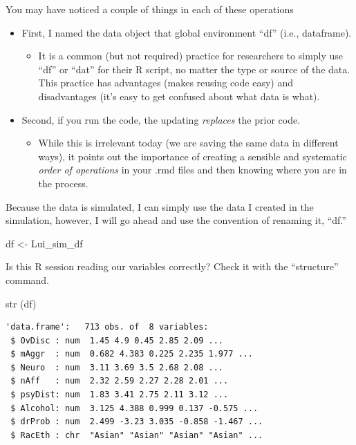 \documentclass[
  english,
]{book}
\newenvironment{Shaded}{\begin{snugshade}}{\end{snugshade}}
\newcommand{\FunctionTok}[1]{\textcolor[rgb]{0.00,0.00,0.00}{#1}}
\newcommand{\NormalTok}[1]{#1}
\newcommand{\OtherTok}[1]{\textcolor[rgb]{0.56,0.35,0.01}{#1}}
\providecommand{\tightlist}{%
  \setlength{\itemsep}{0pt}\setlength{\parskip}{0pt}}
\begin{document}
You may have noticed a couple of things in each of these operations

\begin{itemize}
\tightlist
\item
  First, I named the data object that global environment ``df'' (i.e., dataframe).

  \begin{itemize}
  \tightlist
  \item
    It is a common (but not required) practice for researchers to simply use ``df'' or ``dat'' for their R script, no matter the type or source of the data. This practice has advantages (makes reusing code easy) and disadvantages (it's easy to get confused about what data is what).
  \end{itemize}
\item
  Second, if you run the code, the updating \emph{replaces} the prior code.

  \begin{itemize}
  \tightlist
  \item
    While this is irrelevant today (we are saving the same data in different ways), it points out the importance of creating a sensible and systematic \emph{order of operations} in your .rmd files and then knowing where you are in the process.
  \end{itemize}
\end{itemize}

Because the data is simulated, I can simply use the data I created in the simulation, however, I will go ahead and use the convention of renaming it, ``df.''

\begin{Shaded}
\begin{Highlighting}[]
\NormalTok{df }\OtherTok{\textless{}{-}}\NormalTok{ Lui\_sim\_df}
\end{Highlighting}
\end{Shaded}

Is this R session reading our variables correctly? Check it with the ``structure'' command.

\begin{Shaded}
\begin{Highlighting}[]
\FunctionTok{str}\NormalTok{ (df)}
\end{Highlighting}
\end{Shaded}

\begin{verbatim}
'data.frame':   713 obs. of  8 variables:
 $ OvDisc : num  1.45 4.9 0.45 2.85 2.09 ...
 $ mAggr  : num  0.682 4.383 0.225 2.235 1.977 ...
 $ Neuro  : num  3.11 3.69 3.5 2.68 2.08 ...
 $ nAff   : num  2.32 2.59 2.27 2.28 2.01 ...
 $ psyDist: num  1.83 3.41 2.75 2.11 3.12 ...
 $ Alcohol: num  3.125 4.388 0.999 0.137 -0.575 ...
 $ drProb : num  2.499 -3.23 3.035 -0.858 -1.467 ...
 $ RacEth : chr  "Asian" "Asian" "Asian" "Asian" ...
\end{verbatim}
\end{document}
